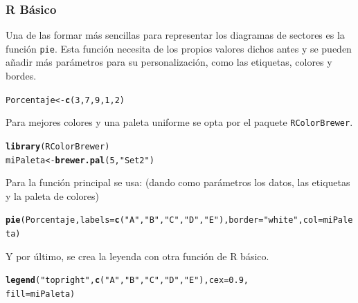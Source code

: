 \documentclass{article}\usepackage[]{graphicx}\usepackage[]{color}
\makeatletter
\newcommand{\hlnum}[1]{\textcolor[rgb]{0.686,0.059,0.569}{#1}}%
\newcommand{\hlstr}[1]{\textcolor[rgb]{0.192,0.494,0.8}{#1}}%
\newcommand{\hlstd}[1]{\textcolor[rgb]{0.345,0.345,0.345}{#1}}%
\newcommand{\hlkwb}[1]{\textcolor[rgb]{0.69,0.353,0.396}{#1}}%
\newcommand{\hlkwc}[1]{\textcolor[rgb]{0.333,0.667,0.333}{#1}}%
\newcommand{\hlkwd}[1]{\textcolor[rgb]{0.737,0.353,0.396}{\textbf{#1}}}%
\newenvironment{kframe}{%
 \def\at@end@of@kframe{}%
 \ifinner\ifhmode%
  \def\at@end@of@kframe{\end{minipage}}%
  \begin{minipage}{\columnwidth}%
 \fi\fi%
 \def\FrameCommand##1{\hskip\@totalleftmargin \hskip-\fboxsep
 \colorbox{shadecolor}{##1}\hskip-\fboxsep
     \hskip-\linewidth \hskip-\@totalleftmargin \hskip\columnwidth}%
 \MakeFramed {\advance\hsize-\width
   \@totalleftmargin\z@ \linewidth\hsize
   \@setminipage}}%
 {\par\unskip\endMakeFramed%
 \at@end@of@kframe}
\newenvironment{knitrout}{}{} %
\makeatother
\begin{document}
\subsubsection{R B\'asico}
Una de las formar m\'as sencillas para representar los diagramas de sectores es la funci\'on \texttt{pie}. Esta funci\'on necesita de los propios valores dichos antes y se pueden a\~nadir m\'as par\'ametros para su personalizaci\'on, como las etiquetas, colores y bordes.
\begin{knitrout}
\color{fgcolor}\begin{kframe}
\begin{alltt}
\hlstd{Porcentaje} \hlkwb{<-} \hlkwd{c}\hlstd{(}\hlnum{3}\hlstd{,}\hlnum{7}\hlstd{,}\hlnum{9}\hlstd{,}\hlnum{1}\hlstd{,}\hlnum{2}\hlstd{)}
\end{alltt}
\end{kframe}
\end{knitrout}
Para mejores colores y una paleta uniforme se opta por el paquete \texttt{RColorBrewer}.
\begin{knitrout}
\color{fgcolor}\begin{kframe}
\begin{alltt}
\hlkwd{library}\hlstd{(RColorBrewer)}
\hlstd{miPaleta} \hlkwb{<-} \hlkwd{brewer.pal}\hlstd{(}\hlnum{5}\hlstd{,} \hlstr{"Set2"}\hlstd{)}
\end{alltt}
\end{kframe}
\end{knitrout}
Para la funci\'on principal se usa: (dando como par\'ametros los datos, las etiquetas y la paleta de colores)
\begin{knitrout}
\color{fgcolor}\begin{kframe}
\begin{alltt}
\hlkwd{pie}\hlstd{(Porcentaje,} \hlkwc{labels} \hlstd{=} \hlkwd{c}\hlstd{(}\hlstr{"A"}\hlstd{,}\hlstr{"B"}\hlstd{,}\hlstr{"C"}\hlstd{,}\hlstr{"D"}\hlstd{,}\hlstr{"E"}\hlstd{),} \hlkwc{border} \hlstd{=} \hlstr{"white"}\hlstd{,} \hlkwc{col} \hlstd{= miPaleta)}
\end{alltt}
\end{kframe}
\end{knitrout}
Y por \'ultimo, se crea la leyenda con otra funci\'on de R b\'asico.
\begin{knitrout}
\color{fgcolor}\begin{kframe}
\begin{alltt}
\hlkwd{legend}\hlstd{(}\hlstr{"topright"}\hlstd{,} \hlkwd{c}\hlstd{(}\hlstr{"A"}\hlstd{,}\hlstr{"B"}\hlstd{,}\hlstr{"C"}\hlstd{,}\hlstr{"D"}\hlstd{,} \hlstr{"E"}\hlstd{),} \hlkwc{cex} \hlstd{=} \hlnum{0.9}\hlstd{,}
   \hlkwc{fill} \hlstd{= miPaleta)}
\end{alltt}
\end{kframe}
\end{knitrout}
\end{document}
